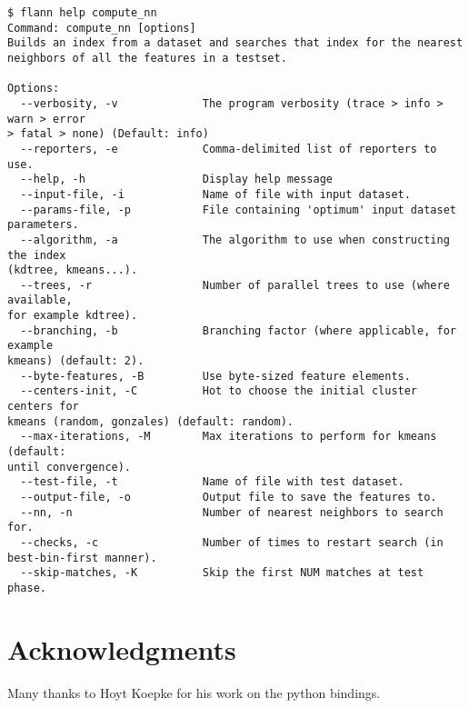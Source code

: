 \documentclass[letter,10pt]{article}
\begin{document}
\begin{Verbatim}[fontsize=\footnotesize,frame=single]
$ flann help compute_nn
Command: compute_nn [options]
Builds an index from a dataset and searches that index for the nearest
neighbors of all the features in a testset.

Options:
  --verbosity, -v             The program verbosity (trace > info > warn > error
> fatal > none) (Default: info)
  --reporters, -e             Comma-delimited list of reporters to use.
  --help, -h                  Display help message
  --input-file, -i            Name of file with input dataset.
  --params-file, -p           File containing 'optimum' input dataset
parameters.
  --algorithm, -a             The algorithm to use when constructing the index
(kdtree, kmeans...).
  --trees, -r                 Number of parallel trees to use (where available,
for example kdtree).
  --branching, -b             Branching factor (where applicable, for example
kmeans) (default: 2).
  --byte-features, -B         Use byte-sized feature elements.
  --centers-init, -C          Hot to choose the initial cluster centers for
kmeans (random, gonzales) (default: random).
  --max-iterations, -M        Max iterations to perform for kmeans (default:
until convergence).
  --test-file, -t             Name of file with test dataset.
  --output-file, -o           Output file to save the features to.
  --nn, -n                    Number of nearest neighbors to search for.
  --checks, -c                Number of times to restart search (in
best-bin-first manner).
  --skip-matches, -K          Skip the first NUM matches at test phase.

\end{Verbatim}


\section{Acknowledgments}

Many thanks to Hoyt Koepke for his work on the python bindings.






\end{document}
